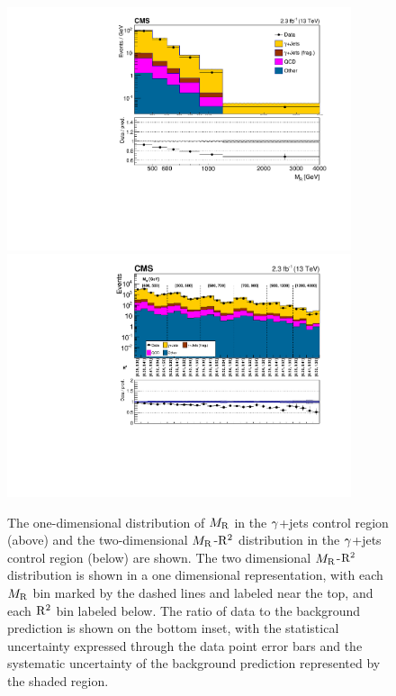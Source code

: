 \begin{figure}[!htb] \centering
\includegraphics[width=0.9\textwidth]{figs/analysis13TeV/Znunu/Razor_PhotonControlRegion_MR_PhotonCR_Logy.pdf} \\
\includegraphics[width=0.9\textwidth]{figs/analysis13TeV/Znunu/Razor_PhotonControlRegion_MRRsqUnrolled_PhotonCR_Logy.pdf}
\caption{The one-dimensional distribution of $M_\mathrm{R}$ in the $\gamma$+jets control region
  (above) and the two-dimensional $M_\mathrm{R}$-$\mathrm{R}^2$ distribution in
  the $\gamma$+jets control region (below) are shown. The two dimensional $M_\mathrm{R}$-$\mathrm{R}^2$ distribution is shown
in a one dimensional representation, with each $M_\mathrm{R}$ bin marked by the dashed lines and labeled near the top,
and each $\mathrm{R}^2$ bin labeled below. The ratio of data to the background prediction is shown on the bottom inset, with
the statistical uncertainty expressed through the data point error bars and the systematic uncertainty of the
background prediction represented by the shaded region. 
} 
\label{fig:Znn_PhotonJets}
\end{figure}


